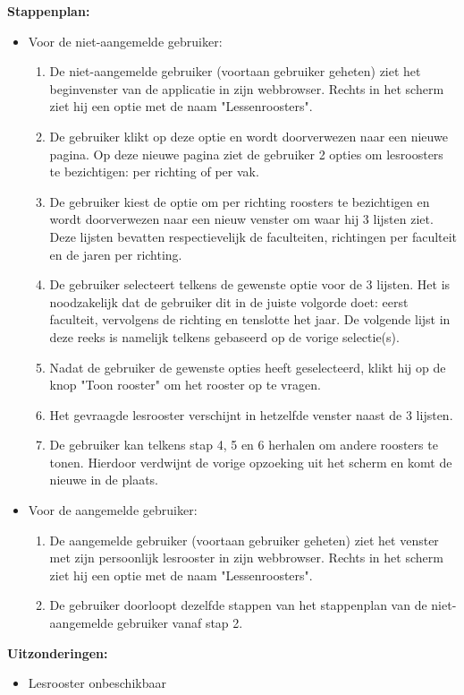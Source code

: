 \textbf{Stappenplan:}
\begin{itemize}
\item Voor de niet-aangemelde gebruiker: 
	\begin{enumerate}
		\item De niet-aangemelde gebruiker (voortaan gebruiker geheten) ziet het beginvenster van de applicatie in zijn webbrowser. Rechts in het scherm ziet hij een optie met de naam "Lessenroosters".
		\item De gebruiker klikt op deze optie en wordt doorverwezen naar een nieuwe pagina. Op deze nieuwe pagina ziet de gebruiker 2 opties om lesroosters te bezichtigen: per richting of per vak.
		\item De gebruiker kiest de optie om per richting roosters te bezichtigen en wordt doorverwezen naar een nieuw venster om waar hij 3 lijsten ziet. Deze lijsten bevatten respectievelijk de faculteiten, richtingen per faculteit en de jaren per richting.
		\item De gebruiker selecteert telkens de gewenste optie voor de 3 lijsten. Het is noodzakelijk dat de gebruiker dit in de juiste volgorde doet: eerst faculteit, vervolgens de richting en tenslotte het jaar. De volgende lijst in deze reeks is namelijk telkens gebaseerd op de vorige selectie(s).
		\item Nadat de gebruiker de gewenste opties heeft geselecteerd, klikt hij op de knop "Toon rooster" om het rooster op te vragen.
		\item Het gevraagde lesrooster verschijnt in hetzelfde venster naast de 3 lijsten.
		\item De gebruiker kan telkens stap 4, 5 en 6 herhalen om andere roosters te tonen. Hierdoor verdwijnt de vorige opzoeking uit het scherm en komt de nieuwe in de plaats.
	\end{enumerate}
\item Voor de aangemelde gebruiker:
	\begin{enumerate}
	\item De aangemelde gebruiker (voortaan gebruiker geheten) ziet het venster met zijn persoonlijk lesrooster in zijn webbrowser. Rechts in het scherm ziet hij een optie met de naam "Lessenroosters".
	\item De gebruiker doorloopt dezelfde stappen van het stappenplan van de niet-aangemelde gebruiker vanaf stap 2.
	\end{enumerate}
\end{itemize}

\textbf{Uitzonderingen:}
\begin{itemize}
\item Lesrooster onbeschikbaar
\end{itemize}

